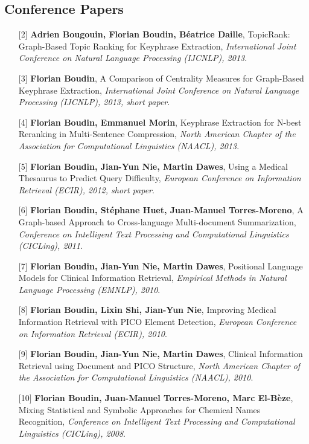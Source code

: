 \documentclass[11pt,a4paper]{moderncv}
\begin{document}
    \subsection{Conference Papers}
    \begin{itemize}[leftmargin=1.2cm,itemsep=0.1cm]
        \item[{\small$[$2$]$}] \textbf{Adrien Bougouin, Florian Boudin, Béatrice Daille}, TopicRank: Graph-Based Topic Ranking for Keyphrase Extraction, \textit{International Joint Conference on Natural Language Processing (IJCNLP), 2013}.
        \item[{\small$[$3$]$}] \textbf{Florian Boudin}, A Comparison of Centrality Measures for Graph-Based Keyphrase Extraction, \textit{International Joint Conference on Natural Language Processing (IJCNLP), 2013, short paper}.
        \item[{\small$[$4$]$}] \textbf{Florian Boudin, Emmanuel Morin}, Keyphrase Extraction for N-best Reranking in Multi-Sentence Compression, \textit{North American Chapter of the Association for Computational Linguistics (NAACL), 2013}.
        \item[{\small$[$5$]$}] \textbf{Florian Boudin, Jian-Yun Nie, Martin Dawes}, Using a Medical Thesaurus to Predict Query Difficulty, \textit{European Conference on Information Retrieval (ECIR), 2012, short paper}.
        \item[{\small$[$6$]$}] \textbf{Florian Boudin, Stéphane Huet, Juan-Manuel Torres-Moreno}, A Graph-based Approach to Cross-language Multi-document Summarization, \textit{Conference on Intelligent Text Processing and Computational Linguistics (CICLing), 2011}.
        \item[{\small$[$7$]$}] \textbf{Florian Boudin, Jian-Yun Nie, Martin Dawes}, Positional Language Models for Clinical Information Retrieval, \textit{Empirical Methods in Natural Language Processing (EMNLP), 2010}.
        \item[{\small$[$8$]$}] \textbf{Florian Boudin, Lixin Shi, Jian-Yun Nie}, Improving Medical Information Retrieval with PICO Element Detection, \textit{European Conference on Information Retrieval (ECIR), 2010}.
        \item[{\small$[$9$]$}] \textbf{Florian Boudin, Jian-Yun Nie, Martin Dawes}, Clinical Information Retrieval using Document and PICO Structure, \textit{North American Chapter of the Association for Computational Linguistics (NAACL), 2010}.
        \item[{\small$[$10$]$}] \textbf{Florian Boudin, Juan-Manuel Torres-Moreno, Marc El-Bèze}, Mixing Statistical and Symbolic Approaches for Chemical Names Recognition, \textit{Conference on Intelligent Text Processing and Computational Linguistics (CICLing), 2008}.

\end{itemize}
\end{document}
